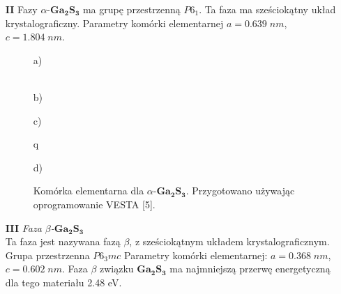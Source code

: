 \begin{enumerate}
	\item[\textbf{II}] Fazy $\alpha$-$\mathbf{Ga_{2}S_{3}}$ ma grupę przestrzenną $P6_1$. Ta faza ma sześciokątny układ krystalograficzny. Parametry komórki elementarnej $a=0.639\;nm$, $c=1.804\;nm$.
	
	\begin{figure}[H]
		\begin{minipage}[h]{0.47\linewidth}
			 a) \\
		\end{minipage}
		\hfill
		\begin{minipage}[h]{0.47\linewidth}
			 \\b)
		\end{minipage}
		\vfill
		\begin{minipage}[h]{0.47\linewidth}
			 c) \\
		\end{minipage}q
		\hfill
		\begin{minipage}[h]{0.47\linewidth}
			 d) \\
		\end{minipage}
		\caption{Komórka elementarna dla $\alpha$-$\mathbf{Ga_{2}S_{3}}$. Przygotowano używając oprogramowanie VESTA [5].}
	\end{figure}

	\item[\textbf{III}] \textit{Faza $\beta$-$\mathbf{Ga_{2}S_{3}}$} \\
	Ta faza jest nazywana fazą $\beta$, z sześciokątnym układem krystalograficznym. Grupa przestrzenna $P6_{3}mc$ Parametry komórki elementarnej: $a=0.368\;nm$,  $c=0.602\;nm$. Faza $\beta$ związku $\mathbf{Ga_{2}S_{3}}$ ma najmniejszą przerwę energetyczną dla tego materiału 2.48 eV.
	

\end{enumerate}
